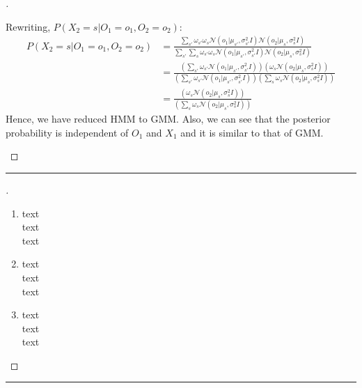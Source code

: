 \documentclass[a4paper, 12pt]{article}
\begin{document}
\begin{proof}[]
\begin{enumerate}[label={\color{blue}{\textbf{2.\arabic*})}}]
     Rewriting, $P(X_2=s| O_1=o_1,O_2=o_2)$:
     \begin{align*}
         P(X_2=s| O_1=o_1,O_2=o_2) &= \frac{\sum\nolimits_{s'}\omega_{s'}\omega_{s}\mathcal{N}(o_1 | \mu_{s'},\sigma^2_{s'}I)\mathcal{N}(o_2 | \mu_{s},\sigma^2_{s}I)}{\sum\nolimits_{s'}\sum\nolimits_{s}\omega_{s'}\omega_{s}\mathcal{N}(o_1 | \mu_{s'},\sigma^2_{s'}I)\mathcal{N}(o_2 | \mu_{s},\sigma^2_{s}I)}\\
         &= \frac{(\sum\nolimits_{s'}\omega_{s'}\mathcal{N}(o_1 | \mu_{s'},\sigma^2_{s'}I))(\omega_{s}\mathcal{N}(o_2 | \mu_{s},\sigma^2_{s}I))}{(\sum\nolimits_{s'}\omega_{s'}\mathcal{N}(o_1 | \mu_{s'},\sigma^2_{s'}I))(\sum\nolimits_{s}\omega_{s}\mathcal{N}(o_2 | \mu_{s},\sigma^2_{s}I))}\\
         &= \frac{(\omega_{s}\mathcal{N}(o_2 | \mu_{s},\sigma^2_{s}I))}{(\sum\nolimits_{s}\omega_{s}\mathcal{N}(o_2 | \mu_{s},\sigma^2_{s}I))}
     \end{align*}
     Hence, we have reduced HMM to GMM. Also, we can see that the posterior probability is independent of $O_1$ and $X_1$ and it is similar to that of GMM.
    
\end{enumerate}
\end{proof}
\hrule
\bigskip

\begin{proof}[]
\hfill
\begin{enumerate}[label={\color{blue}{\textbf{3.\arabic*})}}]
    \item 
        text \\
        text \\
        text 
        
        
    \item 
        text \\
        text \\
        text 
        
        
    \item 
        text \\
        text \\
        text 
    
\end{enumerate}

\end{proof}
\hrule
\bigskip
\end{document}
